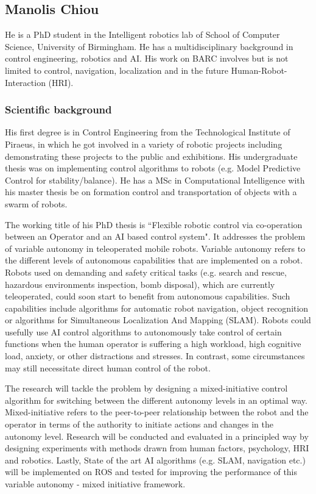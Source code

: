 \documentclass[conference]{IEEEtran}
\begin{document}
\subsection{Manolis Chiou}

He is a PhD student in the Intelligent robotics lab of School of Computer Science, University of Birmingham. He has a multidisciplinary background in control engineering, robotics and AI. His work on BARC involves but is not limited to control, navigation, localization and in the future Human-Robot-Interaction (HRI).

\subsubsection*{Scientific background}

His first degree is in Control Engineering from the Technological Institute of Piraeus, in which he got involved in a variety of robotic projects including demonstrating these projects to the public and exhibitions. His undergraduate thesis was on implementing control algorithms to robots (e.g. Model Predictive Control for stability/balance). He has a MSc in Computational Intelligence with his master thesis be on formation control and transportation of objects with a swarm of robots.  

The working title of his PhD thesis is ``Flexible robotic control via co-operation between an Operator and an AI based control system". It addresses the problem of variable autonomy in teleoperated mobile robots. Variable autonomy refers to the different levels of autonomous capabilities that are implemented on a robot. Robots used on demanding and safety critical tasks (e.g. search and rescue, hazardous environments inspection, bomb disposal), which are currently teleoperated, could soon start to benefit from autonomous capabilities. Such capabilities include algorithms for automatic robot navigation, object recognition or algorithms for Simultaneous Localization And Mapping (SLAM). Robots could usefully use AI control algorithms to autonomously take control of certain functions when the human operator is suffering a high workload, high cognitive load, anxiety, or other distractions and stresses. In contrast, some circumstances may still necessitate direct human control of the robot.

The research will tackle the problem by designing a mixed-initiative control algorithm for switching between the different autonomy levels in an optimal way. Mixed-initiative refers to the peer-to-peer relationship between the robot and the operator in terms of the authority to initiate actions and changes in the autonomy level. Research will be conducted and evaluated in a principled way by designing experiments with methods drawn from human factors, psychology, HRI and robotics. Lastly, State of the art AI algorithms (e.g. SLAM, navigation etc.) will be implemented on ROS and tested for improving the performance of this variable autonomy - mixed initiative framework.
\end{document}
